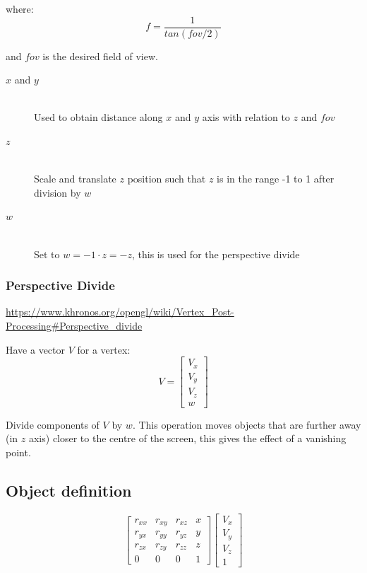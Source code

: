 \documentclass[a4paper]{article}
\begin{document}
where:
\[
  f = \frac{1}{tan(fov / 2)}
\]

and $fov$ is the desired field of view.

\begin{description}
  \item[$x$ and $y$] \hfill \\
    Used to obtain distance along $x$ and $y$ axis with relation to $z$ and
    $fov$

  \item[$z$] \hfill \\
    Scale and translate $z$ position such that $z$ is in the range -1 to 1 after
    division by $w$

  \item[$w$] \hfill \\
    Set to $w = -1 \cdot z = -z$, this is used for the perspective divide

\end{description}

\subsubsection{Perspective Divide}

\url{https://www.khronos.org/opengl/wiki/Vertex_Post-Processing#Perspective_divide}

Have a vector $V$ for a vertex:
\[
  V =
  \left [
    \begin{array}{c}
      V_{x} \\
      V_{y} \\
      V_{z} \\
      w
    \end{array}
  \right ]
\]

Divide components of $V$ by $w$. This operation moves objects that are further
away (in $z$ axis) closer to the centre of the screen, this gives the effect of
a vanishing point.

\subsection{Object definition}

\[
  \left [
    \begin{array}{cccc}
      r_{xx}  & r_{xy}  & r_{xz}  & x \\
      r_{yx}  & r_{yy}  & r_{yz}  & y \\
      r_{zx}  & r_{zy}  & r_{zz}  & z \\
      0       & 0       & 0       & 1
    \end{array}
  \right ]
  \left [
    \begin{array}{c}
      V_{x} \\
      V_{y} \\
      V_{z} \\
      1
    \end{array}
  \right ]
\]
\end{document}
